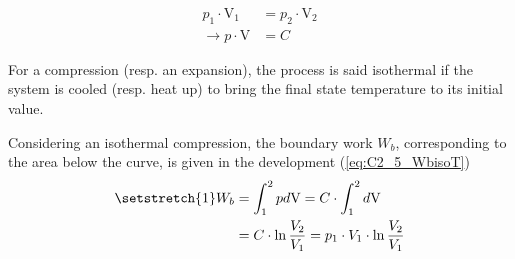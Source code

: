   \begin{align}
    p_1\cdot \mathrm{V}_1 &= p_2\cdot \mathrm{V}_2\nonumber\\
    \rightarrow p\cdot \mathrm{V} &= C \label{eq:C2_5_isoT}  
  \end{align}


 For a compression (resp. an expansion), the process is said isothermal if the system is cooled (resp. heat up) to bring the final state temperature to its initial value.

Considering an isothermal compression, the boundary work $W_b$, corresponding to the area below the curve, is given in the development (\ref{eq:C2_5_WbisoT})
\begin{align}
  \setstretch{1}
  W_b &= \int_1^2 pd\mathrm{V} = C\cdot\int_1^2d\mathrm{V}\nonumber\\
  &= C\cdot \ln \frac{V_2}{V_1} = p_1\cdot V_1\cdot \ln \frac{V_2}{V_1} \label{eq:C2_5_WbisoT}
\end{align} 
